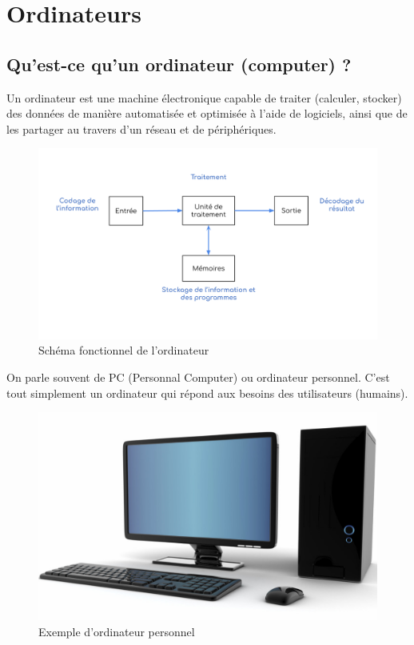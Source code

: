 \documentclass[11pt, a4paper]{book}
\begin{document}
\setcounter{chapter}{4}

\chapter{Ordinateurs}

\section{Qu’est-ce qu’un ordinateur (computer) ?}

\begin{defi}
	Un ordinateur est une machine électronique capable de traiter (calculer, stocker) des données de manière automatisée et optimisée à l'aide de logiciels, ainsi que de les partager au travers d'un réseau et de périphériques. 
\end{defi}

\begin{center}
\begin{figure}[ht!]
	\includegraphics[scale=.4]{images/shema_ordinateur.png}
	\caption{Schéma fonctionnel de l'ordinateur}
\end{figure}
\end{center}
	
	On parle souvent de PC (Personnal Computer) ou ordinateur personnel. C'est tout simplement un ordinateur qui répond aux besoins des utilisateurs (humains).

\begin{center}
\begin{figure}[h]
	\includegraphics[scale=.3]{images/ordinateur}
	\caption{Exemple d'ordinateur personnel}
\end{figure}
\end{center}
	
\end{document}
